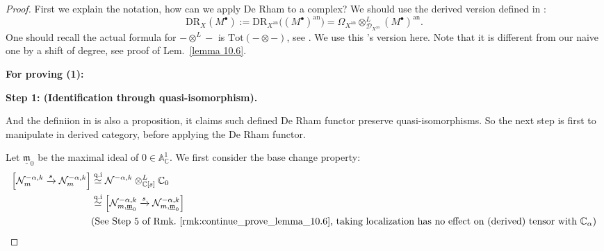 \begin{proof}
    First we explain the notation, how can we apply De Rham to a complex?
    We should use the derived version defined in \cite[Sect.~4.7]{hotta2008d}:
    \[
        \mathrm{DR}_X(M^\bullet) := \mathrm{DR}_{X^\mathrm{an}}\big((M^\bullet)^\mathrm{an}\big) = \Omega_{X^\mathrm{an}} \otimes^L_{\mathcal{D}_{X^\mathrm{an}}} (M^\bullet)^\mathrm{an}.
    \]
    One should recall the actual formula for $-\otimes^L -$ is $\mathrm{Tot}(-\otimes-)$, see \cite[\href{https://stacks.math.columbia.edu/tag/064M}{Tag 064M}, \href{https://stacks.math.columbia.edu/tag/06XZ}{Tag 06XZ}, \href{https://stacks.math.columbia.edu/tag/06Y0}{Tag 06Y0}, \href{https://stacks.math.columbia.edu/tag/064K}{Tag 064K}, \href{https://stacks.math.columbia.edu/tag/0GWN}{Tag 0GWN}]{stacks-project}.
    We use this \cite{hotta2008d}'s version here. Note that it is different from our naive one by a shift of degree, see proof of Lem.~\ref{lemma 10.6}.

    \bigskip

    \noindent\textbf{For proving (1):}

    \noindent\textbf{Step 1: (Identification through quasi-isomorphism).}

    And the definiion in \cite{hotta2008d} is also a proposition, it claims such defined De Rham functor preserve quasi-isomorphisms.
    So the next step is first to manipulate in derived category, before applying the De Rham functor.

    \medskip

    Let $\underline{\mathfrak{m}}_0$ be the maximal ideal of $0 \in \mathbb{A}_{\mathbb{C}}^1$. We first consider the base change property:
    \begin{align*}
        \left[\mathcal{N}_{m}^{-\alpha,k} \xrightarrow{s} \mathcal{N}_{m}^{-\alpha,k}\right] & \stackrel{\text{q.i}}{\simeq} \mathcal{N}^{-\alpha,k} \otimes^{L}_{\mathbb{C}[s]} \mathbb{C}_{0}                                                                            \\
                                                                                             & \stackrel{\text{q.i}}{\simeq} \left[\mathcal{N}^{-\alpha,k}_{m,\underline{\mathfrak{m}}_{0}} \xrightarrow{s}\mathcal{N}^{-\alpha,k}_{m,\underline{\mathfrak{m}}_{0}}\right] \\
                                                                                             & \text{(See Step 5 of Rmk.~\ref{rmk:continue_prove_lemma_10.6}, taking localization has no effect on (derived) tensor with $\mathbb{C}_\alpha$)}
    \end{align*}


\end{proof}
